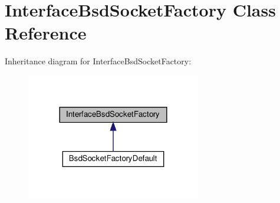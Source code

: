 \hypertarget{classInterfaceBsdSocketFactory}{}\section{Interface\+Bsd\+Socket\+Factory Class Reference}
\label{classInterfaceBsdSocketFactory}


Inheritance diagram for Interface\+Bsd\+Socket\+Factory\+:\nopagebreak
\begin{figure}[H]
\begin{center}
\leavevmode
\includegraphics[width=216pt]{dc/dfa/classInterfaceBsdSocketFactory__inherit__graph}
\end{center}
\end{figure}
